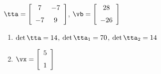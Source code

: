 {$\tta = \left[ \begin {array}{cc} 7&-7\\\noalign{\medskip}-7&9\end {array}
 \right] $,
 \quad
$\vb = \left[ \begin {array}{c} 28\\\noalign{\medskip}-26\end {array}
 \right]$}
{\begin{enumerate}
\item	$\det{\tta} = 14$, $\det{\tta_1} = 70$, $\det{\tta_2} = 14$
\item $\vx = \left[ \begin {array}{c} 5\\\noalign{\medskip}1\end {array} \right]$
\end{enumerate}
}
  

  

 


